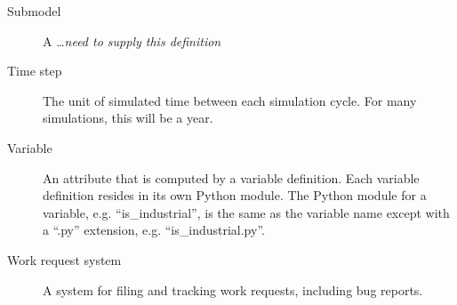 \begin{description}
\item[Submodel] 
A \ldots \emph{need to supply this definition}

\item[Time step] 
The unit of simulated time between each simulation cycle. For many
simulations, this will be a year.

\item[Variable] \variablesindex
An attribute \attributesindex that is computed by a variable \variablesindex definition.  Each
variable \variablesindex definition resides in its own Python \pythonindex module.  The 
Python \pythonindex module for a variable, \variablesindex e.g. ``is_industrial'', is the
same as the variable \variablesindex name except with a ``.py'' extension, 
e.g. ``is_industrial.py''.  

\item[Work request system] 
A system for filing and tracking work requests, including bug
reports.

\end{description}
